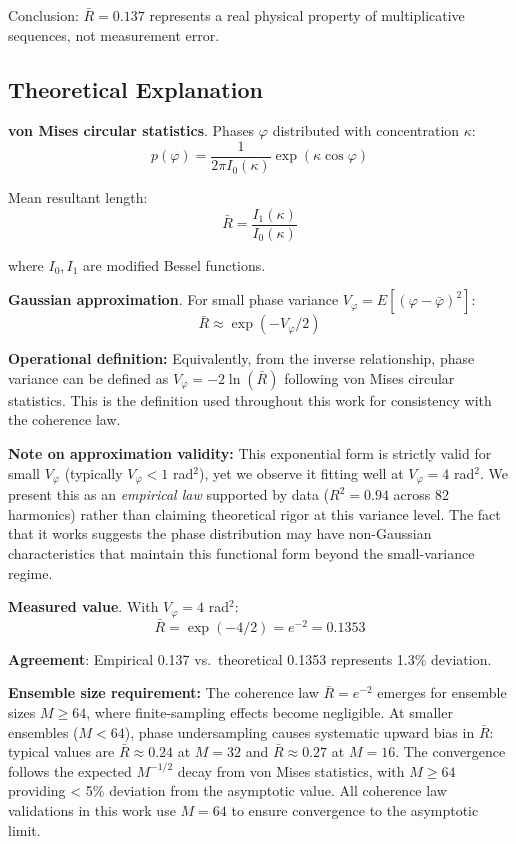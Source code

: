 \documentclass[10pt,twocolumn]{article}
\begin{document}
Conclusion: $\bar{R} = 0.137$ represents a real physical property of multiplicative sequences, not measurement error.

\subsection{Theoretical Explanation}

\textbf{von Mises circular statistics}. Phases $\varphi$ distributed with concentration $\kappa$:
\begin{equation}
p(\varphi) = \frac{1}{2\pi I_0(\kappa)} \exp(\kappa \cos \varphi)
\end{equation}

Mean resultant length:
\begin{equation}
\bar{R} = \frac{I_1(\kappa)}{I_0(\kappa)}
\end{equation}

where $I_0, I_1$ are modified Bessel functions.

\textbf{Gaussian approximation}. For small phase variance $V_\varphi = E[(\varphi - \bar{\varphi})^2]$:
\begin{equation}
\bar{R} \approx \exp({-}V_\varphi/2)
\end{equation}

\textbf{Operational definition:} Equivalently, from the inverse relationship, phase variance can be defined as $V_\varphi = {-}2 \ln(\bar{R})$ following von Mises circular statistics. This is the definition used throughout this work for consistency with the coherence law.

\textbf{Note on approximation validity:} This exponential form is strictly valid for small $V_\varphi$ (typically $V_\varphi < 1$ rad$^2$), yet we observe it fitting well at $V_\varphi = 4$ rad$^2$. We present this as an \emph{empirical law} supported by data ($R^2 = 0.94$ across 82 harmonics) rather than claiming theoretical rigor at this variance level. The fact that it works suggests the phase distribution may have non-Gaussian characteristics that maintain this functional form beyond the small-variance regime.

\textbf{Measured value}. With $V_\varphi = 4$ rad$^2$:
\begin{equation}
\bar{R} = \exp({-}4/2) = e^{-2} = 0.1353
\end{equation}

\textbf{Agreement}: Empirical 0.137 vs.\ theoretical 0.1353 represents 1.3\% deviation.

\textbf{Ensemble size requirement:} The coherence law $\bar{R} = e^{-2}$ emerges for ensemble sizes $M \geq 64$, where finite-sampling effects become negligible. At smaller ensembles ($M < 64$), phase undersampling causes systematic upward bias in $\bar{R}$: typical values are $\bar{R} \approx 0.24$ at $M=32$ and $\bar{R} \approx 0.27$ at $M=16$. The convergence follows the expected $M^{-1/2}$ decay from von Mises statistics, with $M \geq 64$ providing < 5\% deviation from the asymptotic value. All coherence law validations in this work use $M = 64$ to ensure convergence to the asymptotic limit.
\end{document}
